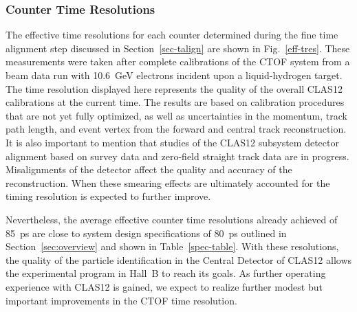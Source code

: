 \documentclass[3p,times,twocolumn]{elsarticle}
\begin{document}
\subsubsection{Counter Time Resolutions}
\label{tres-beam}

The effective time resolutions for each counter determined during the fine time alignment step
discussed in Section~\ref{sec-talign} are shown in Fig.~\ref{eff-tres}. These measurements were
taken after complete calibrations of the CTOF system from a beam data run with 10.6~GeV electrons
incident upon a liquid-hydrogen target. The time resolution displayed here represents the quality of the
overall CLAS12 calibrations at the current time. The results are based on calibration procedures that
are not yet fully optimized, as well as uncertainties in the momentum, track path length, and event vertex
from the forward and central track reconstruction. It is also important to mention that studies of the
CLAS12 subsystem detector alignment based on survey data and zero-field straight track data are in
progress. Misalignments of the detector affect the quality and accuracy of the reconstruction. When these
smearing effects are ultimately accounted for the timing resolution is expected to further improve.

Nevertheless, the average effective counter time resolutions already achieved of 85~ps are close to system
design specifications of 80~ps outlined in Section~\ref{sec:overview} and shown in Table~\ref{spec-table}.
With these resolutions, the quality of the particle identification in the Central Detector of CLAS12 allows the
experimental program in Hall~B to reach its goals. As further operating experience with CLAS12 is gained, we
expect to realize further modest but important improvements in the CTOF time resolution.
\end{document}
